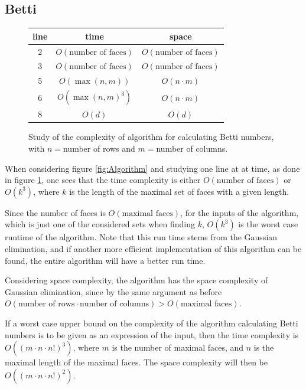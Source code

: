 \documentclass[11pt,a4paper,twoside, openright]{report}
\begin{document}
\subsection{Betti}
\begin{figure}[H]
\center
\begin{tabular}{c|c|c}
line&time&space\\
\hline
2&$O(\text{number of faces})$&$O(\text{number of faces})$\\
3&$O(\text{number of faces})$&$O(\text{number of faces})$\\
5&$O(\max(n,m))$&$O(n\cdot m)$\\
6&$O(\max(n,m)^3)$&$O(n\cdot m)$\\
8&$O(d)$&$O(d)$\\
\end{tabular}
\caption{Study of the complexity of algorithm for calculating Betti numbers, with $n=$number of rows and $m=$number of columns.}
\label{fig:runtime}
\end{figure}
When considering figure \ref{fig:Algorithm} and studying one line at at time, as done in figure \ref{fig:runtime}, one sees that the time complexity is either $O(\text{number of faces})$ or $O(k^3)$, where $k$ is the length of the maximal set of faces with a given length.

Since the number of faces is $O(\text{maximal faces})$, for the inputs of the algorithm, which is just one of the considered sets when finding $k$, $O(k^3)$ is the worst case runtime of the algorithm. Note that this run time stems from the Gaussian elimination, and if another more efficient implementation of this algorithm can be found, the entire algorithm will have a better run time.

Considering space complexity, the algorithm has the space complexity of Gaussian elimination, since by the same argument as before $O(\text{number of rows}\cdot \text{number of columns})>O(\text{maximal faces})$.

If a worst case upper bound on the complexity of the algorithm calculating Betti numbers is to be given as an expression of the input, then the time complexity is $O((m\cdot n\cdot n!)^3)$, where $m$ is the number of maximal faces, and $n$ is the maximal length of the maximal faces. The space complexity will then be $O((m\cdot n\cdot n!)^2)$.
\end{document}
